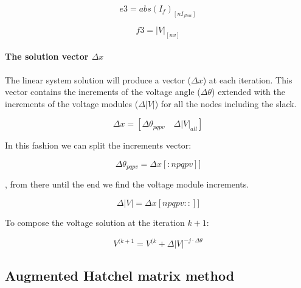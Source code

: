 \documentclass[a4paper,twoside,fleqn]{tufte-book}
\begin{document}
\begin{equation}
e3 = abs\left(I_f\right)_{[nI_{flow}]}
\end{equation}


\begin{equation}
f3 = |V|_{[nv]}
\end{equation}



\paragraph{The solution vector $\Delta x$}

The linear system solution will produce a vector ($\Delta x$) at each iteration. This vector contains the increments of the voltage angle ($\Delta \theta$) extended with the increments of the voltage modules ($\Delta |V|$) for all the nodes including the slack.

\begin{equation}
\Delta x = [ \Delta \theta_{pqpv} \quad \Delta|V|_{all} ]
\end{equation}

In this fashion we can split the increments vector:

\begin{equation}
\Delta \theta_{pqpv} = \Delta x[:npqpv]]
\end{equation}

, from there until the end we find the voltage module increments.

\begin{equation}
\Delta |V| = \Delta x[npqpv::]]
\end{equation}

To compose the voltage solution at the iteration $k+1$:

\begin{equation}
V^{(k+1} =  V^{(k} + \Delta |V| ^{-j \cdot \Delta \theta}
\end{equation}


\subsection{Augmented Hatchel matrix method}
\end{document}
